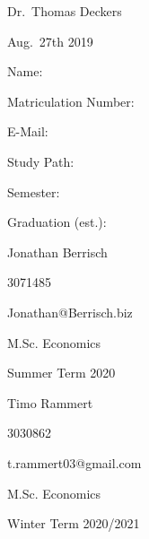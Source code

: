 \documentclass[11pt,]{article}
\begin{document}
\begin{titlepage}
  \noindent\begin{minipage}[t]{0.3\textwidth}
  \end{minipage}
  \begin{minipage}[t]{0.7\textwidth}
  \hspace{1cm}Dr.~Thomas Deckers
  \end{minipage}

  \noindent\begin{minipage}[t]{0.3\textwidth}
  \end{minipage}
  \begin{minipage}[t]{0.7\textwidth}
  \hspace{1cm}Aug.~27th 2019
  \end{minipage}

  \hrulefill

  \begin{multicols}{3}

  Name:

  Matriculation Number:

  E-Mail:

  Study Path:

  Semester:

  Graduation (est.):

  \columnbreak

  Jonathan Berrisch

  3071485

  Jonathan@Berrisch.biz

  M.Sc. Economics


  Summer Term 2020

  \columnbreak

  Timo Rammert

  3030862

  t.rammert03@gmail.com

  M.Sc. Economics


  Winter Term 2020/2021

  \end{multicols}

\end{titlepage}


{
\hypersetup{linkcolor=black}
\setcounter{tocdepth}{3}
\tableofcontents
}

\newpage
\listoffigures
{}
\end{document}
